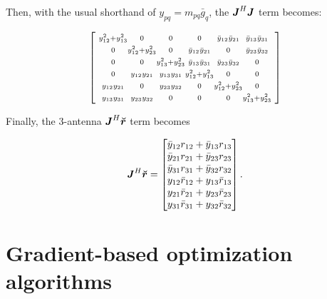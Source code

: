\documentclass[useAMS,usenatbib]{mn2e}
\makeatletter
\newcommand{\mat}[1]{{\bmath{#1}}}
\newcommand{\JJ}{\mat{J}} %
\newcommand{\Matrix}[2]{\left [ \begin{array}{@{}#1@{}}#2\end{array} \right ]}
\newcommand{\AUG}[1]{\bmath{\breve{#1}}}
\newcommand{\Rr}{\AUG{r}}
\makeatother
\begin{document}
Then, with the usual shorthand of $y_{pq} = m_{pq} \bar{g}_q$, the
$\JJ^H\JJ$ term becomes:

\begin{equation}
\label{eq:JHJ:3ant}
\Matrix{@{~}c@{}c@{}c@{}c@{}c@{}c@{~}}{
\scriptstyle\yysq{12}{13} &\scriptstyle 0             &\scriptstyle 0             &\scriptstyle 0             &\scriptstyle \bb{1}{2}       &\scriptstyle \bb{1}{3} \\
\scriptstyle0             &\scriptstyle \yysq{12}{23} &\scriptstyle 0             &\scriptstyle \bb{1}{2}       &\scriptstyle 0             &\scriptstyle \bb{2}{3} \\
\scriptstyle0             &\scriptstyle 0             &\scriptstyle \yysq{13}{23} &\scriptstyle \bb{1}{3}       &\scriptstyle \bb{2}{3}       &\scriptstyle 0       \\
\scriptstyle0             &\scriptstyle \bbb{1}{2}      &\scriptstyle \bbb{1}{3}      &\scriptstyle \yysq{12}{13} &\scriptstyle 0             &\scriptstyle 0       \\ 
\scriptstyle\bbb{1}{2}      &\scriptstyle 0             &\scriptstyle \bbb{2}{3}      &\scriptstyle 0             &\scriptstyle \yysq{12}{23} &\scriptstyle 0 \\
\scriptstyle\bbb{1}{3}      &\scriptstyle \bbb{2}{3}      &\scriptstyle 0             &\scriptstyle 0             &\scriptstyle 0             &\scriptstyle  \yysq{13}{23} \\
}
\end{equation}

Finally, the 3-antenna $\JJ^H\Rr$ term becomes

\begin{equation}
\label{eq:JHR:3ant}
\JJ^H\Rr = \Matrix{c}{
\bar{y}_{12} r_{12} + \bar{y}_{13} r_{13} \\
\bar{y}_{21} r_{21} + \bar{y}_{23} r_{23} \\
\bar{y}_{31} r_{31} + \bar{y}_{32} r_{32} \\
y_{12} \bar{r}_{12} + y_{13} \bar{r}_{13}   \\
y_{21} \bar{r}_{21} + y_{23} \bar{r}_{23}   \\
y_{31} \bar{r}_{31} + y_{32} \bar{r}_{32}   \\
}.
\end{equation}

\section{Gradient-based optimization algorithms}
\label{sec:algs}
\end{document}
